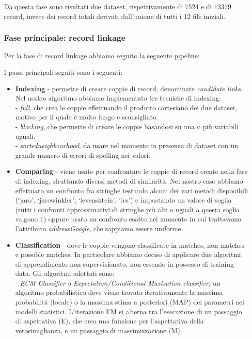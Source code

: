 \documentclass[a4paper,12pt]{article}
\begin{document}
Da questa fase sono risultati due dataset, rispettivamente di 7524 e di 13379 record, invece dei %
record totali derivati dall'unione di tutti i 12 file iniziali.

\subsubsection{Fase principale: record linkage}
Per la fase di record linkage abbiamo seguito la seguente pipeline: 

I passi principali seguiti sono i seguenti:
\begin{itemize}
\item \textbf{Indexing} - permette di creare coppie di record, denominate \textit{candidate links}. Nel nostro algoritmo abbiamo implementato tre tecniche di indexing: \\
- \textit{full}, che crea le coppie effettuando il prodotto cartesiano dei due dataset, motivo per il quale è molto lungo e sconsigliato. \\
- \textit{blocking}, che permette di creare le coppie basandosi su una o più variabili uguali. \\
- \textit{sortedneighbourhood}, da usare nel momento in presenza di dataset con un grande numero di errori di spelling nei valori.
\item \textbf{Comparing} - viene usato per confrontare le coppie di record create nella fase di indexing, sfruttando diversi metodi di similarità. Nel nostro caso abbiamo effettuato un confronto fra stringhe testando alcuni dei vari metodi disponibili (‘jaro’, ‘jarowinkler’, ‘levenshtein’, ‘lcs’) e impostando un valore di soglia (tutti i confronti approssimativi di stringhe più alti o uguali a questa soglia valgono 1) oppure usato un confronto esatto nel momento in cui trattavamo l'attributo \textit{addressGoogle}, che sappiamo essere uniforme.
\item \textbf{Classification} - dove le coppie vengono classificate in matches, non-matches e possible matches. In particolare abbiamo deciso di applicare due algoritmi di apprendimento non supervisionato, non essendo in possesso di training data. Gli algoritmi adottati sono: \\
- \textit{ECM Classifier} o \textit{Expectation/Conditional Maxisation classifier}, un algoritmo probabilistico dove viene trovata iterativamente la massima probabilità (locale) o la massima stima a posteriori (MAP) dei parametri nei modelli statistici. L'iterazione EM si alterna tra l'esecuzione di un passaggio di aspettativa (E), che crea una funzione per l'aspettativa della verosimiglianza, e un passaggio di massimizzazione (M). \\

\end{itemize}
\end{document}
